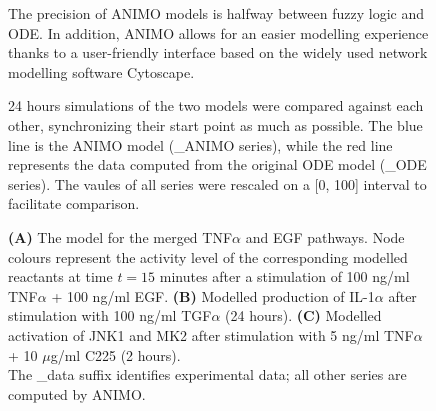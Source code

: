\documentclass{bmcart}
\begin{document}
\begin{backmatter}
\begin{figure}[htbp]
 \begin{center}
 \end{center}
\caption{
The precision of ANIMO models is halfway between fuzzy logic and ODE. In addition, ANIMO
allows for an easier modelling experience thanks to a user-friendly interface based on
the widely used network modelling software Cytoscape.\label{fig:animo-spectrum}}
\end{figure}

\begin{figure}[!htpb]
\begin{center}
\end{center}
\caption{\label{fig:grafici-drosophila-smaller} 24 hours simulations of the two models were compared
against each other, synchronizing their start point as much as possible. The blue line is the ANIMO model
({\sf \_{}ANIMO} series), while the red line represents the data computed from the original ODE model
({\sf \_{}ODE} series). The vaules of all series were rescaled on a [0, 100] interval to facilitate comparison.}
\end{figure}


\begin{figure}[!htpb]
\centering
\caption{
{\bf(A)}
The model for the merged TNF$\alpha$ and EGF pathways. Node colours represent the
activity level of the corresponding modelled reactants at time $t = 15$ minutes after
a stimulation of 100 ng/ml TNF$\alpha$ + 100 ng/ml EGF.
{\bf(B)}
Modelled production of IL-1$\alpha$ after stimulation with 100 ng/ml TGF$\alpha$ (24 hours).
{\bf(C)}
Modelled activation of JNK1 and MK2 after stimulation with 5 ng/ml TNF$\alpha$ + 10 $\mu$g/ml C225 (2 hours).
\\
The {\sf \_{}data} suffix identifies experimental data; all other series are computed by ANIMO.}\label{fig:large-model-all}
\end{figure}


\end{backmatter}
\end{document}
